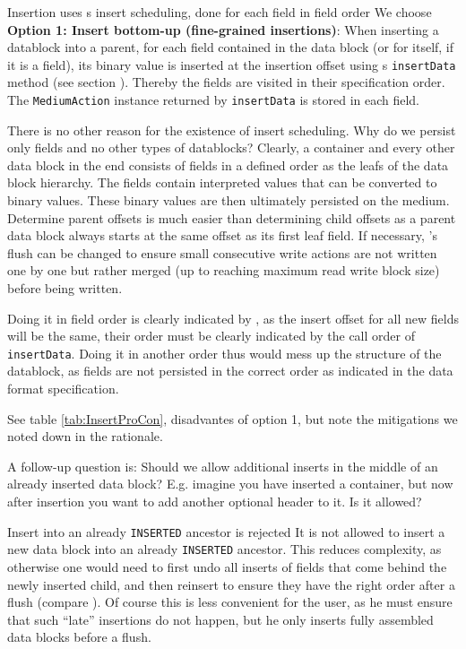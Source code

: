 {%
Insertion uses \COMPmedia{}s insert scheduling, done for each field in field order
}
{%
We choose \textbf{Option 1: Insert bottom-up (fine-grained insertions)}: When inserting a datablock into a parent, for each field contained in the data block (or for  itself, if it is a field), its binary value is inserted at the insertion offset using \COMPmedia{}s \texttt{insertData} method (see section ). Thereby the fields are visited in their specification order. The \texttt{MediumAction} instance returned by \texttt{insertData} is stored in each field.
}
{%
  There is no other reason for the existence of insert scheduling. Why do we persist only fields and no other types of datablocks? Clearly, a container and every other data block in the end consists of fields in a defined order as the leafs of the data block hierarchy. The fields contain interpreted values that can be converted to binary values. These binary values are then ultimately persisted on the medium. Determine parent offsets is much easier than determining child offsets as a parent data block always starts at the same offset as its first leaf field. If necessary, \COMPmedia{}'s flush can be changed to ensure small consecutive write actions are not written one by one but rather merged (up to reaching maximum read write block size) before being written.

  Doing it in field order is clearly indicated by , as the insert offset for all new fields will be the same, their order must be clearly indicated by the call order of \texttt{insertData}. Doing it in another order thus would mess up the structure of the datablock, as fields are not persisted in the correct order as indicated in the data format specification.
}
{%
See table \ref{tab:InsertProCon}, disadvantes of option 1, but note the mitigations we noted down in the rationale.
}

A follow-up question is: Should we allow additional inserts in the middle of an already inserted data block? E.g. imagine you have inserted a container, but now after insertion you want to add another optional header to it. Is it allowed?

{%
Insert into an already \texttt{INSERTED} ancestor is rejected
}
{%
It is not allowed to insert a new data block into an already \texttt{INSERTED} ancestor.
}
{%
This reduces complexity, as otherwise one would need to first undo all inserts of fields that come behind the newly inserted child, and then reinsert to ensure they have the right order after a flush (compare ).
}
{%
Of course this is less convenient for the user, as he must ensure that such ``late'' insertions do not happen, but he only inserts fully assembled data blocks before a flush.
}

